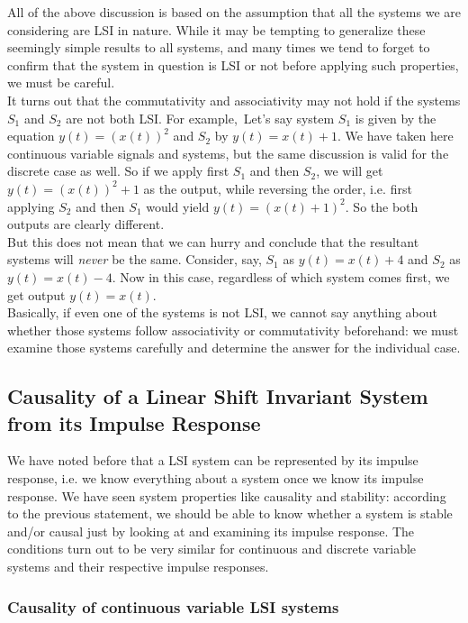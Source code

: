 All of the above discussion is based on the assumption that all the systems we are considering are LSI in nature. While it may be tempting to generalize these seemingly simple results to all systems, and many times we tend to forget to confirm that the system in question is LSI or not before applying such properties, we must be careful. \\
It turns out that the commutativity and associativity may not hold if the systems $S_{1}$ and $S_{2}$ are not both LSI. For example,\
Let's say system $S_{1}$ is given by the equation $y(t)=(x(t))^2$ and $S_{2}$ by $y(t)=x(t)+1$. We have taken here continuous variable signals and systems, but the same discussion is valid for the discrete case as well. So if we apply first $S_{1}$ and then $S_{2}$, we will get $y(t)=(x(t))^2 +1$ as the output, while reversing the order, i.e. first applying $S_{2}$ and then $S_{1}$ would yield $y(t)=(x(t)+1)^2$. So the both outputs are clearly different.\\
But this does not mean that we can hurry and conclude that the resultant systems will \textit{never} be the same. Consider, say, $S_{1}$ as $y(t)=x(t)+4$ and $S_{2}$ as $y(t)=x(t)-4$. Now in this case, regardless of which system comes first, we get output $y(t)=x(t)$.\\
Basically, if even one of the systems is not LSI, we cannot say anything about whether those systems follow associativity or commutativity beforehand: we must examine those systems carefully and determine the answer for the individual case.


\subsection{Causality of a Linear Shift Invariant System from its Impulse Response}

We have noted before that a LSI system can be represented by its impulse response, i.e. we know everything about a system once we know its impulse response. We have seen system properties like causality and stability: according to the previous statement, we should be able to know whether a system is stable and/or causal just by looking at and examining its impulse response. The conditions turn out to be very similar for continuous and discrete variable systems and their respective impulse responses.

\subsubsection{Causality of continuous variable LSI systems}

